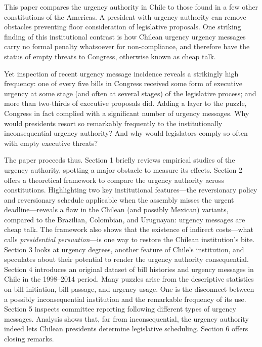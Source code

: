 \documentclass[letter,12pt]{article}
\begin{document}
This paper compares the urgency authority in Chile to those found in a few other constitutions of the Americas. A president with urgency authority can remove obstacles preventing floor consideration of legislative proposals. One striking finding of this institutional contrast is how Chilean urgency urgency messages carry no formal penalty whatsoever for non-compliance, and therefore have the status of empty threats to Congress, otherwise known as cheap talk. 

Yet inspection of recent urgency message incidence reveals a strikingly high frequency: one of every five bills in Congress received some form of executive urgency at some stage (and often at several stages) of the legislative process; and more than two-thirds of executive proposals did. Adding a layer to the puzzle, Congress in fact complied with a significant number of urgency messages. Why would presidents resort so remarkably frequently to the institutionally inconsequential urgency authority? And why would legislators comply so often with empty executive threats?

The paper proceeds thus. Section 1 briefly reviews empirical studies of the urgency authority, spotting a major obstacle to measure its effects. Section 2 offers a theoretical framework to compare the urgency authority across constitutions. Highlighting two key institutional features---the reversionary policy and reversionary schedule applicable when the assembly misses the urgent deadline---reveals a flaw in the Chilean (and possibly Mexican) variants, compared to the Brazilian, Colombian, and Uruguayan: urgency messages are cheap talk. The framework also shows that the existence of indirect costs---what \citet{neustadt.1990} calls \emph{presidential persuation}---is one way to restore the Chilean institution's bite. Section 3 looks at urgency degrees, another feature of Chile's institution, and speculates about their potential to render the urgency authority consequential. Section 4 introduces an original dataset of bill histories and urgency messages in Chile in the 1998--2014 period. Many puzzles arise from the descriptive statistics on bill initiation, bill passage, and urgency usage. One is the disconnect between a possibly inconsequential institution and the remarkable frequency of its use. Section 5 inspects committee reporting following different types of urgency messages. Analysis shows that, far from inconsequential, the urgency authority indeed lets Chilean presidents determine legislative scheduling. Section 6 offers closing remarks. 
\end{document}
